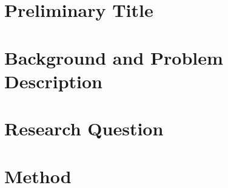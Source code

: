 \documentclass[12pt]{article} %
\begin{document}
\newpage %


\section{Preliminary Title} %





\section{Background and Problem Description} %




\section{Research Question} %



\section{Method}


\end{document}
